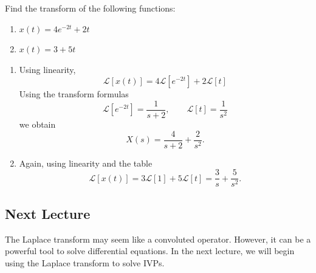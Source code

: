 \documentclass[10pt,letterpaper]{article}
\begin{document}
\begin{example}[5]{
Find the transform of the following functions:
\begin{enumerate}
    \item $x(t)=4e^{-2t}+2t$
    \item $x(t)=3+5t$
\end{enumerate}
}
\begin{enumerate}
    \item Using linearity,
\[
\mathcal{L}[x(t)]
=
4\mathcal{L}[e^{-2t}]
+
2\mathcal{L}[t]
\]
Using the transform formulas
\[
\mathcal{L}[e^{-2t}] = \frac{1}{s+2},
\qquad
\mathcal{L}[t] = \frac{1}{s^2}
\]
we obtain
\[
\boxed{
X(s)=\frac{4}{s+2}+\frac{2}{s^2}.
}
\]
\vspace{4mm}

\item Again, using linearity and the table
\[
\mathcal{L}[x(t)]
=
3\mathcal{L}[1]
+
5\mathcal{L}[t]
=
\boxed{
\frac{3}{s}
+
\frac{5}{s^2}.
}
\]
\end{enumerate}    
\end{example}

\subsection{Next Lecture}
The Laplace transform may seem like a convoluted operator. However, it can be a powerful tool to solve differential equations. In the next lecture, we will begin using the Laplace transform to solve IVPs.
\end{document}
